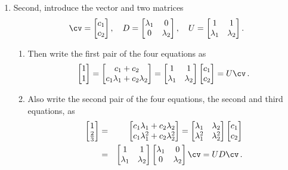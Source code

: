 \begin{example}
\begin{solution}
\begin{enumerate}
\item \label{eg:2expfitb}
Second, introduce the vector and two matrices
\begin{equation*}
\cv=\begin{bmatrix} c_1\\c_2 \end{bmatrix},\quad
D=\begin{bmatrix} \lambda_1&0\\0&\lambda_2 \end{bmatrix},\quad
U=\begin{bmatrix} 1&1\\\lambda_1&\lambda_2 \end{bmatrix}.
\end{equation*}
\begin{enumerate}
\item Then write the first pair of the four equations as
\begin{equation*}
\begin{bmatrix} 1\\1 \end{bmatrix}
=\begin{bmatrix} c_1+c_2\\ c_1\lambda_1+c_2\lambda_2\end{bmatrix}
=\begin{bmatrix} 1&1\\\lambda_1&\lambda_2 \end{bmatrix}\begin{bmatrix} c_1\\c_2 \end{bmatrix}
=U\cv\,.
\end{equation*}

\item Also write the second pair of the four equations, the second and third equations, as
\begin{eqnarray*}
\begin{bmatrix} 1\\\frac23 \end{bmatrix}
&=&\begin{bmatrix} c_1\lambda_1+c_2\lambda_2\\c_1\lambda_1^2+c_2\lambda_2^2\end{bmatrix}
=\begin{bmatrix} \lambda_1&\lambda_2\\\lambda_1^2&\lambda_2^2 \end{bmatrix}\begin{bmatrix} c_1\\c_2 \end{bmatrix}
\\&=&\begin{bmatrix} 1&1\\\lambda_1&\lambda_2 \end{bmatrix}
\begin{bmatrix} \lambda_1&0\\0&\lambda_2 \end{bmatrix}\cv
=UD\cv\,.
\end{eqnarray*}


\end{enumerate}
\end{enumerate}
\end{solution}
\end{example}
